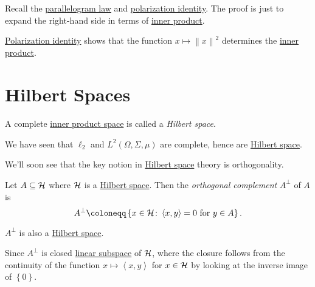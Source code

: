 \begin{prev}
	Recall the \hyperref[lma:parallelogram-law]{parallelogram law} and \hyperref[lma:polatization-identity]{polarization identity}. The proof is just to expand the right-hand side in terms of \hyperref[def:inner-product]{inner product}.
\end{prev}

\begin{remark}
	\hyperref[lma:polatization-identity]{Polarization identity} shows that the function \(x\mapsto \left\lVert x\right\rVert ^{2} \) determines the \hyperref[def:inner-product]{inner product}.
\end{remark}

\section{Hilbert Spaces}

\begin{definition}\label{def:Hilbert-space}
	A complete \hyperref[def:inner-product-space]{inner product space} is called a \emph{Hilbert space}.
\end{definition}

\begin{eg}
	We have seen that \(\ell _2\) and \(L^2(\Omega , \Sigma , \mu )\) are complete, hence are \hyperref[def:Hilbert-space]{Hilbert space}.
\end{eg}

We'll soon see that the key notion in \hyperref[def:Hilbert-space]{Hilbert space} theory is orthogonality.
\begin{definition}\label{def:orthogonal-complement}
	Let \(A \subseteq \mathcal{\MakeUppercase{h}} \) where \(\mathcal{\MakeUppercase{h}}\) is a \hyperref[def:Hilbert-space]{Hilbert space}. Then the \emph{orthogonal complement} \(A^\perp\) of \(A\) is
	\[
		A^\perp \coloneqq \left\{ x\in \mathcal{\MakeUppercase{h}} \colon \left\langle x, y \right\rangle = 0 \text{ for } y\in A \right\}.
	\]
\end{definition}

\begin{remark}
	\(A^\perp\) is also a \hyperref[def:Hilbert-space]{Hilbert space}.
\end{remark}
\begin{explanation}
	Since \(A^\perp\) is closed \hyperref[def:linear-vector-space]{linear subspace} of \(\mathcal{\MakeUppercase{h}} \), where the closure follows from the continuity of the function \(x\mapsto \left\langle x, y \right\rangle \) for \(x\in \mathcal{\MakeUppercase{h}} \) by looking at the inverse image of \(\left\{ 0 \right\}\).
\end{explanation}

